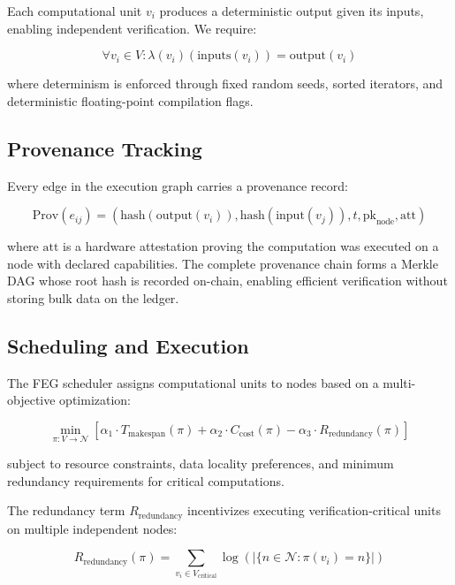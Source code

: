 \documentclass[11pt,a4paper]{article}
\begin{document}
Each computational unit $v_i$ produces a deterministic output given its inputs, enabling independent verification.
We require:

\begin{equation}
    \forall v_i \in V: \lambda(v_i)(\text{inputs}(v_i)) = \text{output}(v_i)
\end{equation}

\noindent where determinism is enforced through fixed random seeds, sorted iterators, and deterministic floating-point compilation flags.

\subsection{Provenance Tracking}

Every edge in the execution graph carries a provenance record:

\begin{equation}
    \text{Prov}(e_{ij}) = (\text{hash}(\text{output}(v_i)), \text{hash}(\text{input}(v_j)), t, \text{pk}_{\text{node}}, \text{att})
\end{equation}

\noindent where $\text{att}$ is a hardware attestation proving the computation was executed on a node with declared capabilities.
The complete provenance chain forms a Merkle DAG whose root hash is recorded on-chain, enabling efficient verification without storing bulk data on the ledger.

\subsection{Scheduling and Execution}

The FEG scheduler assigns computational units to nodes based on a multi-objective optimization:

\begin{equation}
    \min_{\pi: V \rightarrow \mathcal{N}} \left[\alpha_1 \cdot T_{\text{makespan}}(\pi) + \alpha_2 \cdot C_{\text{cost}}(\pi) - \alpha_3 \cdot R_{\text{redundancy}}(\pi)\right]
\end{equation}

\noindent subject to resource constraints, data locality preferences, and minimum redundancy requirements for critical computations.

The redundancy term $R_{\text{redundancy}}$ incentivizes executing verification-critical units on multiple independent nodes:

\begin{equation}
    R_{\text{redundancy}}(\pi) = \sum_{v_i \in V_{\text{critical}}} \log\left(|\{n \in \mathcal{N} : \pi(v_i) = n\}|\right)
\end{equation}
\end{document}
